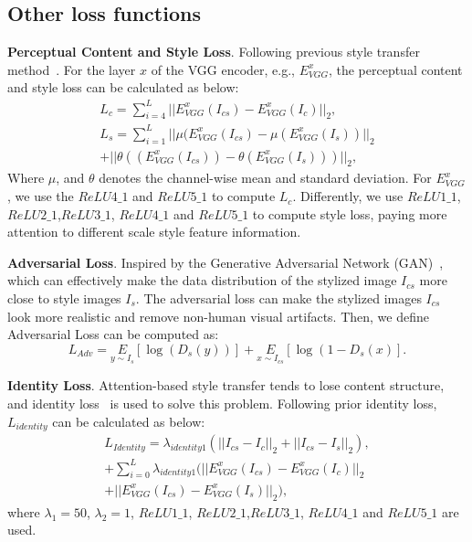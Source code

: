 \documentclass[times,twocolumn,final,authoryear]{elsarticle}
\begin{document}
\subsection{Other loss functions}
\quad\textbf{Perceptual Content and Style Loss}. Following previous style transfer method~\citep{liu2021adaattn,deng2020arbitrary,chen2021artistic,park2019arbitrary}. For the layer $x$ of the VGG encoder, e.g., $E^{x}_{VGG}$, the perceptual content and style loss can be calculated as below:
\begin{equation}
\begin{aligned}
L_{c}= \sum^{L}_{i=4}||E^{x}_{VGG}(I_{cs})
-E^{x}_{VGG}(I_c)||_2,\\
L_{s}= \sum^{L}_{i=1}||\mu (E^{x}_{VGG}(I_{cs})
-\mu(E^{x}_{VGG}(I_s))||_2 \\
+||\theta((E^{x}_{VGG}(I_{cs}))
-\theta(E^{x}_{VGG}(I_s)))||_2,
\end{aligned}
\end{equation}
Where $\mu$, and $\theta$ denotes the channel-wise mean and standard deviation. For $E^{x}_{VGG}$, we use the $ReLU4\_1$ and  $ReLU5\_1$ to compute $L_c$. Differently, we use $ReLU1\_1$, $ReLU2\_1$,$ReLU3\_1$, $ReLU4\_1$ and $ReLU5\_1$ to compute style loss, paying more attention to different scale style feature information.

\textbf{Adversarial Loss}. Inspired by the Generative Adversarial Network (GAN)~\citep{zhu2017unpaired,chen2021artistic}, which can effectively make the data distribution of the stylized image $I_{cs}$ more close to style images $I_{s}$. The adversarial loss can make the stylized images $I_{cs}$ look more realistic and remove non-human visual artifacts. Then, we define Adversarial Loss can be computed as: 
\begin{equation}
L_{Adv}=\underset{y \sim I_s}{E}\left[\log \left(D_s(y)\right)\right]+\underset{x \sim I_{c s}}{E}\left[\log \left(1-D_s(x)\right]\right..
\end{equation}

\textbf{Identity Loss}. Attention-based style transfer tends to lose content structure, and identity loss~\citep{park2019arbitrary,lin2020tuigan,zhao2020unpaired} is used to solve this problem. Following prior identity loss, $L_{identity}$ can be calculated as below:
\begin{equation}
\begin{aligned}
L_{Identity}=\lambda_{identity1}(||I_{cs}-I_c||_2 +||I_{cs}-I_{s}||_2), \\
+ \sum_{i=0}^L\lambda_{identity1}(||E^{x}_{VGG}(I_{cs})-E^{x}_{VGG}(I_c)||_2\\
+||E^{x}_{VGG}(I_{cs})-E^{x}_{VGG}(I_{s})||_2) ,
\end{aligned}
\end{equation}
where $\lambda_{1}=50$, $\lambda_{2}=1$, $ReLU1\_1$, $ReLU2\_1$,$ReLU3\_1$, $ReLU4\_1$ and $ReLU5\_1$ are used.
\end{document}
